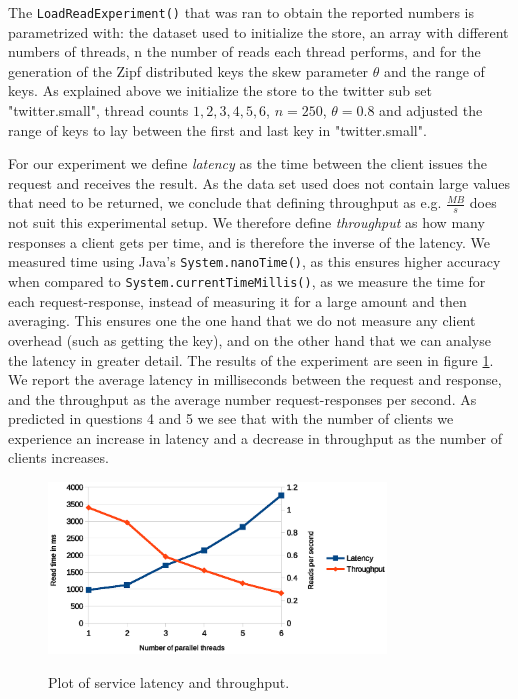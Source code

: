 \documentclass[12pt,a4paper]{article}
\begin{document}
The \texttt{LoadReadExperiment()} that was ran to obtain the reported numbers is parametrized with: the dataset used to initialize the store, an array with different numbers of threads, n the number of reads each thread performs, and for the generation of the Zipf distributed keys the skew parameter $\theta$ and the range of keys. As explained above we initialize the store to the twitter sub set "twitter.small", thread counts ${1, 2, 3, 4, 5, 6}$, $n=250$, $\theta=0.8$ and adjusted the range of keys to lay between the first and last key in "twitter.small".

For our experiment we define \emph{latency} as the time between the client issues the request and receives the result. As the data set used does not contain large values that need to be returned, we conclude that defining throughput as e.g. $\frac{MB}{s}$ does not suit this experimental setup. We therefore define \emph{throughput} as how many responses a client gets per time, and is therefore the inverse of the latency. We measured time using Java's \texttt{System.nanoTime()}, as this ensures higher accuracy when compared to \texttt{System.currentTimeMillis()}, as we measure the time for each request-response, instead of measuring it for a large amount and then averaging. This ensures one the one hand that we do not measure any client overhead (such as getting the key), and on the other hand that we can analyse the latency in greater detail. The results of the experiment are seen in figure \ref{fig:latecnythroughput}. We report the average latency in milliseconds between the request and response, and the throughput as the average number request-responses per second. As predicted in questions 4 and 5 we see that with the number of clients we experience an increase in latency and a decrease in throughput as the number of clients increases. 

\begin{figure}
\centering
  \includegraphics[width=0.8\textwidth]{latencythroughput.eps}\\
  \caption{Plot of service latency and throughput.}
  \label{fig:latecnythroughput}
\end{figure}
\end{document}
